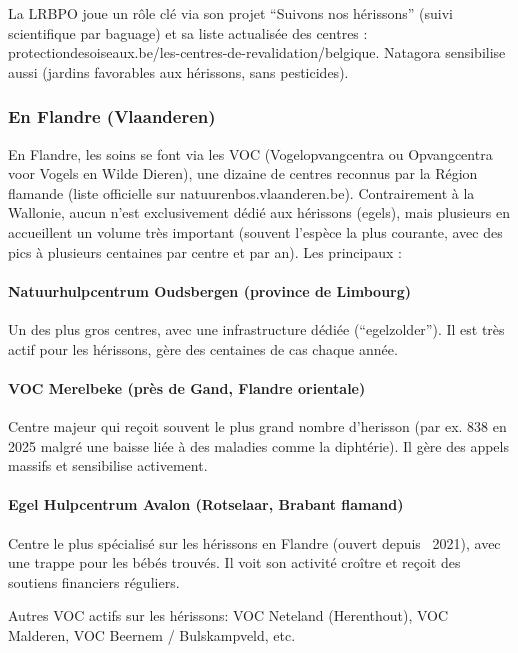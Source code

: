 \documentclass[a4paper,11pt]{article}
\begin{document}
La LRBPO joue un rôle clé via son projet \enquote{Suivons nos hérissons} (suivi scientifique par baguage) et sa liste actualisée des centres : protectiondesoiseaux.be/les-centres-de-revalidation/belgique. Natagora sensibilise aussi (jardins favorables aux hérissons, sans pesticides).

\subsubsection{En Flandre (Vlaanderen)}

En Flandre, les soins se font via les VOC (Vogelopvangcentra ou Opvangcentra voor Vogels en Wilde Dieren), une dizaine de centres reconnus par la Région flamande (liste officielle sur natuurenbos.vlaanderen.be). Contrairement à la Wallonie, aucun n'est exclusivement dédié aux hérissons (egels), mais plusieurs en accueillent un volume très important (souvent l'espèce la plus courante, avec des pics à plusieurs centaines par centre et par an). Les principaux :

\paragraph{Natuurhulpcentrum Oudsbergen (province de Limbourg)}

Un des plus gros centres, avec une infrastructure dédiée (\enquote{egelzolder}). Il est très actif pour les hérissons, gère des centaines de cas chaque année.

\paragraph{VOC Merelbeke (près de Gand, Flandre orientale)}

Centre majeur qui reçoit souvent le plus grand nombre d'herisson (par ex. 838 en 2025 malgré une baisse liée à des maladies comme la diphtérie). Il gère des appels massifs et sensibilise activement.

\paragraph{Egel Hulpcentrum Avalon (Rotselaar, Brabant flamand)}

Centre le plus spécialisé sur les hérissons en Flandre (ouvert depuis ~2021), avec une trappe pour les bébés trouvés. Il voit son activité croître et reçoit des soutiens financiers réguliers.

Autres VOC actifs sur les hérissons: VOC Neteland (Herenthout), VOC Malderen, VOC Beernem / Bulskampveld, etc.
\end{document}

